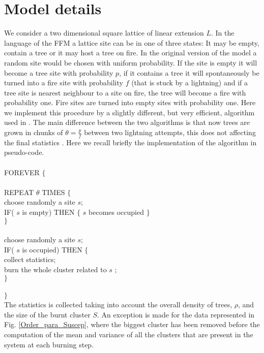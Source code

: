 \documentclass[aps,prl,showpacs,superscriptaddress,groupedaddress,notitlepage]{revtex4-1}
\begin{document}
\section{Model details}
We consider a two dimensional square lattice of linear extension $L$. In the language of the FFM a lattice site can be in one of three states: It may be empty, contain a tree or it may host a tree on fire. In the  original version of the model\cite{Drossel1992} a random site would be chosen with uniform probability. If the site is empty it will become a tree site with probability $p$, if it contains a tree it will spontaneously be turned into a fire site with probability $f$ (that is stuck by a lightning) and if a tree site is nearest neighbour to a site on fire, the tree will become a fire with probability one. Fire sites are turned into empty sites with probability one. Here we implement this procedure by a slightly different, but very efficient, algorithm used in \cite{Pruessner2002,Clar1994,Grassberger1993,Schenk2000}. The main difference between the two algorithms is that now trees are grown in chunks of $\theta = \frac{p}{f}$ between two lightning attempts, this does not affecting the final statistics \cite{Schenk2000}. Here we recall briefly the implementation of the algorithm in pseudo-code.
\\ \\ FOREVER $\lbrace$
\\ \\REPEAT $\theta$ TIMES $\lbrace$ \\
choose randomly a site $s$; \\
IF( $s$ is empty) THEN $\lbrace$ $s$ becomes occupied $\rbrace $
\\      $\rbrace $
\\ 	\\choose randomly a site $s$; \\ 
IF( $s$ is occupied) THEN $\lbrace$ 
\\ collect statistics;
\\ burn the whole cluster related to $s$ ;
\\ $\rbrace $
\\ \\$\rbrace $ \\
The statistics is collected taking into account the overall density of trees, $\rho$, and the size of the burnt cluster $S$. An exception is made for the data represented in Fig. \ref{Order_para_Suscep}, where the biggest cluster has been removed before the computation of the mean and variance of all the clusters that are present in the system at each burning step.
\end{document}
